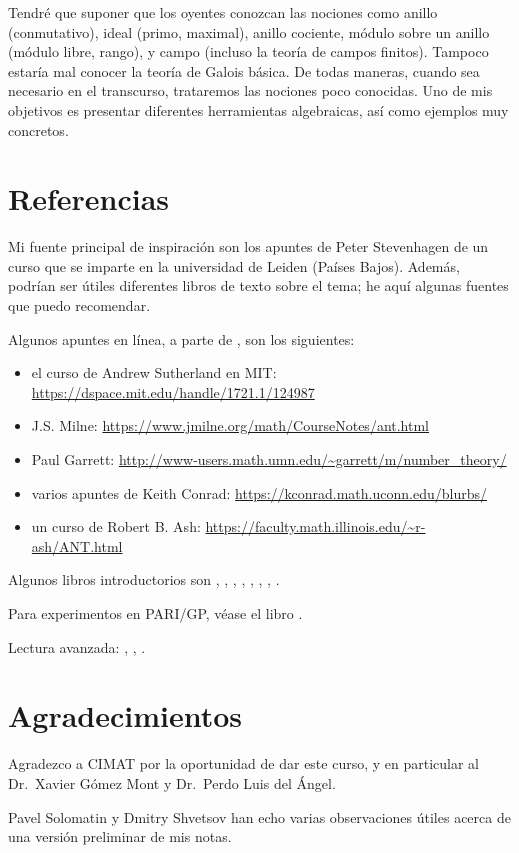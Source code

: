 Tendré que suponer que los oyentes conozcan las nociones como anillo
(conmutativo), ideal (primo, maximal), anillo cociente, módulo sobre un anillo
(módulo libre, rango), y campo (incluso la teoría de campos finitos).
Tampoco estaría mal conocer la teoría de Galois básica. De todas maneras,
cuando sea necesario en el transcurso, trataremos las nociones poco
conocidas. Uno de mis objetivos es presentar diferentes herramientas
algebraicas, así como ejemplos muy concretos.

\section{Referencias}

Mi fuente principal de inspiración son los apuntes de
Peter Stevenhagen \cite{Stevenhagen-NR} de un curso que se imparte en
la universidad de Leiden (Países Bajos). Además, podrían ser útiles diferentes
libros de texto sobre el tema; he aquí algunas fuentes que puedo recomendar.

Algunos apuntes en línea, a parte de \cite{Stevenhagen-NR}, son los siguientes:
\begin{itemize}
\item el curso de Andrew Sutherland en MIT:
  \url{https://dspace.mit.edu/handle/1721.1/124987}

\item J.S. Milne: 
  \url{https://www.jmilne.org/math/CourseNotes/ant.html}

\item Paul Garrett:
  \url{http://www-users.math.umn.edu/~garrett/m/number_theory/}

\item varios apuntes de Keith Conrad:
  \url{https://kconrad.math.uconn.edu/blurbs/}

\item un curso de Robert B. Ash:
  \url{https://faculty.math.illinois.edu/~r-ash/ANT.html}
\end{itemize}

Algunos libros introductorios son
\cite[Chapters 12, 13, 17]{Ireland-Rosen}, 
\cite{Alaca-Williams},
\cite{Kato-NT-2},
\cite{Frohlich-Taylor},
\cite{Marcus-NF},
\cite{Samuel-TAN},
\cite[Chapters 4, 5]{Borevich-Shafarevich},
\cite{Cox-2013}.

Para experimentos en PARI/GP, véase el libro
\cite{Rodriguez-Villegas-2007}.

Lectura avanzada:
\cite{Neukirch-ANT},
\cite{Lang-ANT},
\cite{Cassels-Frohlich}.

\section{Agradecimientos}

Agradezco a CIMAT por la oportunidad de dar este curso, y en particular
al Dr.~Xavier Gómez Mont y Dr.~Perdo Luis del Ángel.

Pavel Solomatin y Dmitry Shvetsov han echo varias observaciones útiles acerca de
una versión preliminar de mis notas.

